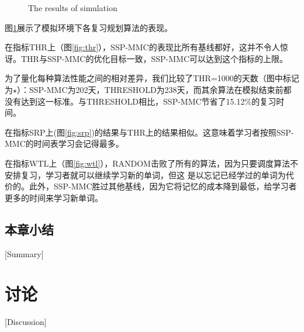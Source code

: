 \begin{figure}[htbp]
    \begin{minipage}{\textwidth}
    \centering
    \subfigure{\label{fig:thr}}\addtocounter{subfigure}{-2}
    \hspace{2em}
    \subfigure{\label{fig:srp}}\addtocounter{subfigure}{-2}
    \end{minipage}
    \centering
    \begin{minipage}{\textwidth}
    \centering
    \subfigure{\label{fig:wtl}}\addtocounter{subfigure}{-2}
    \hspace{2em}
    \subfigure{\label{fig:new}}\addtocounter{subfigure}{-2}
    \end{minipage}
    \vspace{0.2em}
    \caption{The results of simulation}
    \label{fig:simulation}
\end{figure}

图\ref{fig:simulation}展示了模拟环境下各复习规划算法的表现。

在指标THR上（图\ref{fig:thr}），SSP-MMC的表现比所有基线都好，这并不令人惊讶。THR与SSP-MMC的优化目标一致，SSP-MMC可以达到这个指标的上限。

为了量化每种算法性能之间的相对差异，我们比较了THR=1000的天数（图中标记为$\star$）：SSP-MMC为202天，THRESHOLD为238天，而其余算法在模拟结束前都没有达到这一标准。与THRESHOLD相比，SSP-MMC节省了15.12\%的复习时间。

在指标SRP上(图\ref{fig:srp})的结果与THR上的结果相似。这意味着学习者按照SSP-MMC的时间表学习会记得最多。

在指标WTL上（图\ref{fig:wtl}），RANDOM击败了所有的算法，因为只要调度算法不安排复习，学习者就可以继续学习新的单词，但这 是以忘记已经学过的单词为代价的。此外，SSP-MMC胜过其他基线，因为它将记忆的成本降到最低，给学习者更多的时间来学习新单词。

\section{本章小结}[Summary]

\chapter[讨论]{讨论}[Discussion]

